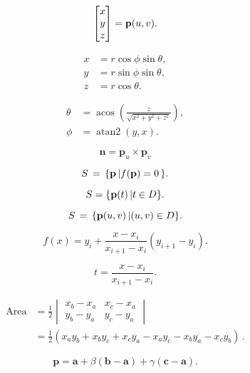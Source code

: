 \documentclass[lang=cn,12pt]{elegantbook}
\begin{document}
$$
  \begin{bmatrix}
    x \\
    y \\
    z
  \end{bmatrix}={\bf p}(u,v).
$$

\begin{equation}
  \begin{aligned}
    x & =r\cos\phi\sin\theta, \\
    y & =r\sin\phi\sin\theta, \\
    z & =r\cos\theta.
  \end{aligned}
\end{equation}

\begin{equation}
  \begin{aligned}
    \theta & =\operatorname{acos}(\frac{z}{\sqrt{x^{2}+y^{2}+z^{2}}}), \\
    \phi   & =\operatorname{atan2}(y,x).
  \end{aligned}
\end{equation}

$$
  \mathbf{n}=\mathbf{p}_{u}\times\mathbf{p}_{v}
$$

$$
  S\,=\,\{{\bf p}\,|f({\bf p})=0\,\}.
$$

$$
  S=\{{\bf p}(t)\,|t\in D\}.
$$

$$
  S\,=\,\{{\bf p}(u,v)\,|(u,v)\in D\}.
$$

\begin{equation}
  f(x)=y_{i}+{\frac{x-x_{i}}{x_{i+1}-x_{i}}}(y_{i+1}-y_{i}).
\end{equation}

$$
  t={\frac{x-x_{i}}{x_{i+1}-x_{i}}}.
$$

\begin{equation}
  \begin{aligned}
    \mathrm{Area} & = \frac{1}{2}
    \begin{vmatrix}
      x_b-x_a & x_c-x_a \\
      y_b-y_a & y_c-y_a
    \end{vmatrix}                                                                                   \\
                  & = \frac{1}{2}(x_{a}y_{b}+x_{b}y_{c}+x_{c}y_{a}-x_{a}y_{c}-x_{b}y_{a}-x_{c}y_{b})\,.
  \end{aligned}
\end{equation}

\begin{equation}
  \mathbf{p}=\mathbf{a}+\beta(\mathbf{b}-\mathbf{a})+\gamma(\mathbf{c}-\mathbf{a}).
\end{equation}
\end{document}

